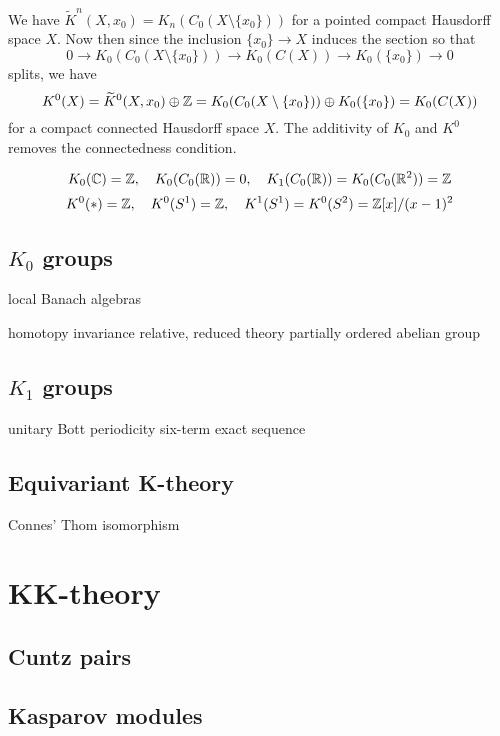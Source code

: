 \documentclass{../../large}
\begin{document}
We have $\tilde K^n(X,x_0)=K_n(C_0(X\setminus\{x_0\}))$ for a pointed compact Hausdorff space $X$.
Now then since the inclusion $\{x_0\}\to X$ induces the section so that
\[0\to K_0(C_0(X\setminus\{x_0\}))\to K_0(C(X))\to K_0(\{x_0\})\to0\]
splits, we have
\[K^0(X)=\widetilde K^0(X,x_0)\oplus\mathbb{Z}=K_0(C_0(X\setminus\{x_0\}))\oplus K_0(\{x_0\})=K_0(C(X))\]
for a compact connected Hausdorff space $X$.
The additivity of $K_0$ and $K^0$ removes the connectedness condition.

\[K_0(\mathbb{C})=\mathbb{Z},\quad K_0(C_0(\mathbb{R}))=0,\quad K_1(C_0(\mathbb{R}))=K_0(C_0(\mathbb{R}^2))=\mathbb{Z}\]
\[K^0(*)=\mathbb{Z},\quad K^0(S^1)=\mathbb{Z},\quad K^1(S^1)=K^0(S^2)=\mathbb{Z}[x]/(x-1)^2\]

\section{$K_0$ groups}

local Banach algebras

homotopy invariance
relative, reduced theory
partially ordered abelian group


\section{$K_1$ groups}

unitary
Bott periodicity
six-term exact sequence


\section{Equivariant K-theory}
\begin{prb}
\end{prb}
Connes' Thom isomorphism




\chapter{KK-theory}

\section{Cuntz pairs}

\section{Kasparov modules}
\end{document}
